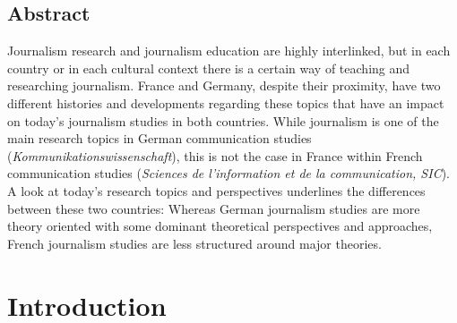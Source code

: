 \documentclass{tufte-handout}
\begin{document}
\begin{titlepage}
\vspace*{1em}


\hypertarget{abstract}{%
\section{Abstract}\label{abstract}}

Journalism research and journalism education are highly interlinked, but
in each country or in each cultural context there is a certain way of
teaching and researching journalism. France and Germany, despite their
proximity, have two different histories and developments regarding these
topics that have an impact on today's journalism studies in both
countries. While journalism is one of the main research topics in German
communication studies (\emph{Kommunikationswissenschaft}), this is not
the case in France within French communication studies (\emph{Sciences
de l'information et de la communication, SIC}). A look at today's
research topics and perspectives underlines the differences between
these two countries: Whereas German journalism studies are more theory
oriented with some dominant theoretical perspectives and approaches,
French journalism studies are less structured around major theories.


\enlargethispage{2\baselineskip}

\vspace*{18em}



 \end{titlepage}


 \hypertarget{introduction}{%
\section{Introduction}\label{introduction}}
\end{document}
